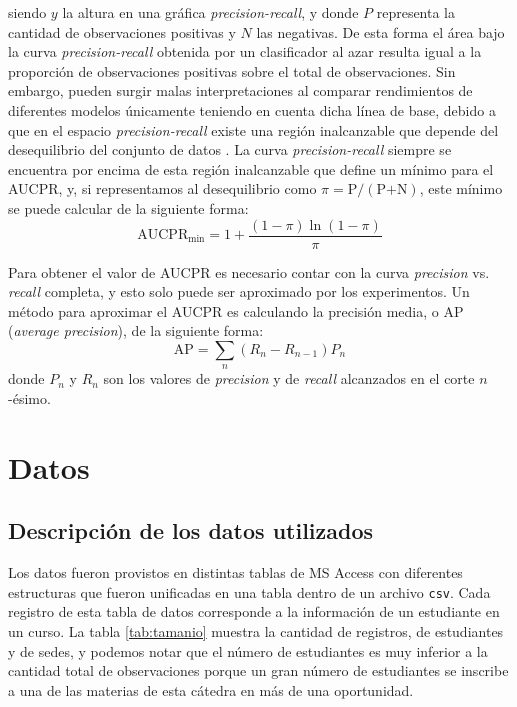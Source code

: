 \documentclass[a4paper,11pt,dvipsnames]{article}
\begin{document}
siendo $y$ la altura en una gráfica \textit{precision-recall}, y donde $P$ representa la cantidad de observaciones positivas y $N$ las negativas. De esta forma el área bajo la curva \textit{precision-recall} obtenida por un clasificador al azar resulta igual a la proporción de observaciones positivas sobre el total de observaciones. Sin embargo, pueden surgir malas interpretaciones al comparar rendimientos de diferentes modelos únicamente teniendo en cuenta dicha línea de base, debido a que en el espacio \textit{precision-recall} existe una región inalcanzable que depende del desequilibrio del conjunto de datos \cite{boyd2012unachievable}. La curva \textit{precision-recall} siempre se encuentra por encima de esta región inalcanzable que define un mínimo para el AUCPR, y, si representamos al desequilibrio como $\pi = \text{P}/(\text{P+N})$, este mínimo se puede calcular de la siguiente forma:
\begin{equation}
    \text{AUCPR}_\text{min} = 1 + \dfrac{(1-\pi)\ln(1-\pi)}{\pi}
\end{equation}

Para obtener el valor de AUCPR es necesario contar con la curva \textit{precision} vs. \textit{recall} completa, y esto solo puede ser aproximado por los experimentos. Un método para aproximar el AUCPR es calculando la precisión media, o AP (\textit{average precision}), de la siguiente forma:
\begin{equation}
    \text{AP} = \sum_n (R_n - R_{n-1})P_n
\end{equation}
donde $P_n$ y $R_n$ son los valores de \textit{precision} y de \textit{recall} alcanzados en el corte $n$-ésimo.


\section{Datos}

\subsection{Descripción de los datos utilizados}

Los datos fueron provistos en distintas tablas de MS Access con diferentes estructuras que fueron unificadas en una tabla dentro de un archivo \texttt{csv}. Cada registro de esta tabla de datos corresponde a la información de un estudiante en un curso. La tabla \ref{tab:tamanio} muestra la cantidad de registros, de estudiantes y de sedes, y podemos notar que el número de estudiantes es muy inferior a la cantidad total de observaciones porque un gran número de estudiantes se inscribe a una de las materias de esta cátedra en más de una oportunidad.\par\medskip
\end{document}
